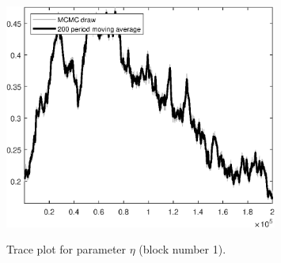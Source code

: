 \begin{figure}[H]
\centering
  \includegraphics[width=0.8\textwidth]{BRS_sectoral_rest/graphs/TracePlot_eta_blck_1}\\
    \caption{Trace plot for parameter ${\eta}$ (block number 1).}
\end{figure}
